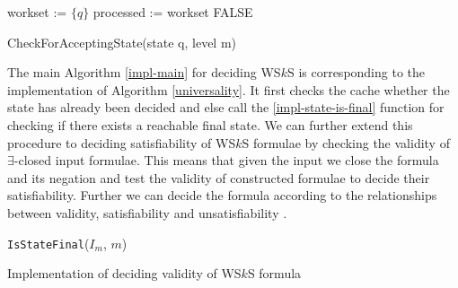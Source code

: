 \begin{function}[h!]
		\BlankLine
		\nl workset := $\{q\}$\;
		\nl processed := workset\;
		\nl {}
			\Return \textsc{FALSE}\;
		\caption{CheckForAcceptingState(state q, level m)}\label{impl-state-is-final}
\end{function}
 
 The main Algorithm \ref{impl-main} for deciding WS$k$S is corresponding to the
 implementation of Algorithm \ref{universality}. It first checks the cache
 whether the state has already been decided and else call the
 \ref{impl-state-is-final} function for checking if there exists a reachable
 final state.
 We can further extend this procedure to deciding satisfiability of WS$k$S
 formulae by checking the validity of $\exists$-closed input formulae. This
 means that given the input we close the formula and its negation and test the
 validity of constructed formulae to decide their satisfiability. Further we can
 decide the formula according to the relationships between validity,
 satisfiability and unsatisfiability \cite{logics}.
 
\begin{algorithm}[h!]
		\BlankLine
		\nl\Return \texttt{IsStateFinal}($I_m$, $m$)\;
		\BlankLine
		\caption{Implementation of deciding validity of WS$k$S formula
		}\label{impl-main}
	\end{algorithm}
 
